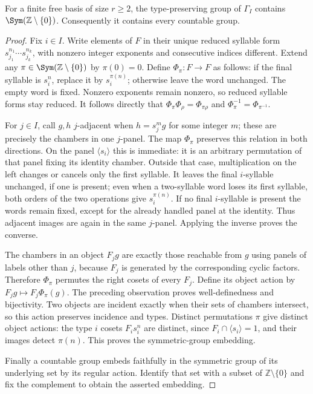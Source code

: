 \begin{theorem}
\label{UR.PanelSymmetric}
For a finite free basis of size $r\ge2$, the type-preserving group of
$\Gamma_I$ contains $\Sym(\mathbb Z\setminus\{0\})$. Consequently
it contains every countable group.
\end{theorem}
\begin{proof}
Fix $i\in I$. Write elements of $F$ in their unique reduced syllable
form $s_{j_1}^{n_1}\cdots s_{j_k}^{n_k}$, with nonzero integer
exponents and consecutive indices different. Extend any
$\pi\in\Sym(\mathbb Z\setminus\{0\})$ by $\pi(0)=0$. Define
$\Phi_\pi:F\to F$ as follows: if the final syllable is $s_i^n$,
replace it by $s_i^{\pi(n)}$; otherwise leave the word unchanged.
The empty word is fixed. Nonzero exponents remain nonzero, so reduced
syllable forms stay reduced. It follows directly that
$\Phi_\pi\Phi_\rho=\Phi_{\pi\rho}$ and
$\Phi_\pi^{-1}=\Phi_{\pi^{-1}}$.

For $j\in I$, call $g,h$ $j$-adjacent when
$h=s_j^m g$ for some integer $m$; these are precisely the chambers in
one $j$-panel. The map $\Phi_\pi$ preserves this relation in both
directions. On the panel $\langle s_i\rangle$ this is immediate: it
is an arbitrary permutation of that panel fixing its identity chamber.
Outside that case, multiplication on the left changes or cancels only
the first syllable. It leaves the final $i$-syllable unchanged, if one
is present; even when a two-syllable word loses its first syllable,
both orders of the two operations give $s_i^{\pi(n)}$. If no final
$i$-syllable is present the words remain fixed, except for the already
handled panel at the identity. Thus adjacent images are again in the
same $j$-panel. Applying the inverse proves the converse.

The chambers in an object $F_jg$ are exactly those reachable from $g$
using panels of labels other than $j$, because $F_j$ is generated by
the corresponding cyclic factors. Therefore $\Phi_\pi$ permutes the
right cosets of every $F_j$. Define its object action by
$F_jg\mapsto F_j\Phi_\pi(g)$. The preceding observation proves
well-definedness and bijectivity. Two objects are incident exactly when
their sets of chambers intersect, so this action preserves incidence
and types. Distinct permutations $\pi$ give distinct object actions: the type
$i$ cosets $F_is_i^n$ are distinct, since
$F_i\cap\langle s_i\rangle=1$, and their images detect $\pi(n)$.
This proves the symmetric-group embedding.

Finally a countable group embeds faithfully in the symmetric group of
its underlying set by its regular action. Identify that set with a
subset of $\mathbb Z\setminus\{0\}$ and fix the complement to obtain
the asserted embedding.
\end{proof}

